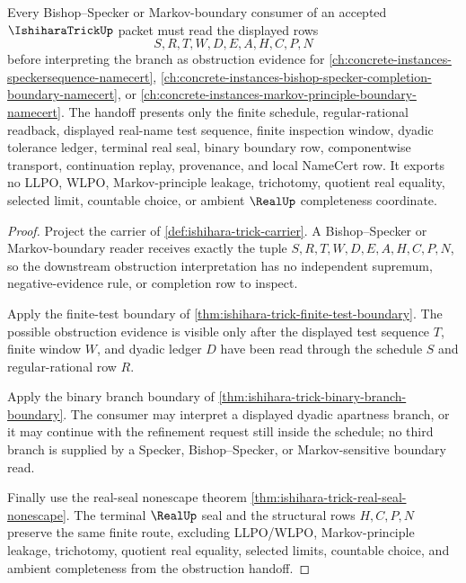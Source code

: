 \begin{theorem}
\label{thm:ishihara-trick-specker-boundary-handoff}
Every Bishop--Specker or Markov-boundary consumer of an accepted $\IshiharaTrickUp$ packet must read the displayed rows
$$
S,R,T,W,D,E,A,H,C,P,N
$$
before interpreting the branch as obstruction evidence for \autoref{ch:concrete-instances-speckersequence-namecert}, \autoref{ch:concrete-instances-bishop-specker-completion-boundary-namecert}, or \autoref{ch:concrete-instances-markov-principle-boundary-namecert}. The handoff presents only the finite schedule, regular-rational readback, displayed real-name test sequence, finite inspection window, dyadic tolerance ledger, terminal real seal, binary boundary row, componentwise transport, continuation replay, provenance, and local NameCert row. It exports no LLPO, WLPO, Markov-principle leakage, trichotomy, quotient real equality, selected limit, countable choice, or ambient $\RealUp$ completeness coordinate.
\end{theorem}
\begin{proof}
Project the carrier of \autoref{def:ishihara-trick-carrier}. A Bishop--Specker or Markov-boundary reader receives exactly the tuple $S,R,T,W,D,E,A,H,C,P,N$, so the downstream obstruction interpretation has no independent supremum, negative-evidence rule, or completion row to inspect.

Apply the finite-test boundary of \autoref{thm:ishihara-trick-finite-test-boundary}. The possible obstruction evidence is visible only after the displayed test sequence $T$, finite window $W$, and dyadic ledger $D$ have been read through the schedule $S$ and regular-rational row $R$.

Apply the binary branch boundary of \autoref{thm:ishihara-trick-binary-branch-boundary}. The consumer may interpret a displayed dyadic apartness branch, or it may continue with the refinement request still inside the schedule; no third branch is supplied by a Specker, Bishop--Specker, or Markov-sensitive boundary read.

Finally use the real-seal nonescape theorem \autoref{thm:ishihara-trick-real-seal-nonescape}. The terminal $\RealUp$ seal and the structural rows $H,C,P,N$ preserve the same finite route, excluding LLPO/WLPO, Markov-principle leakage, trichotomy, quotient real equality, selected limits, countable choice, and ambient completeness from the obstruction handoff.
\end{proof}

